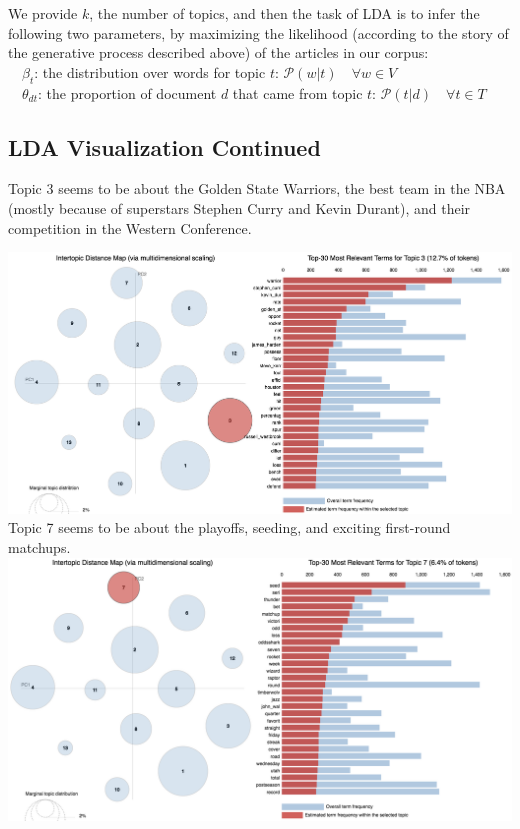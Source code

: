 \documentclass[11pt]{article}
\begin{document}
We provide $k$, the number of topics, and then the task of LDA is to infer the following two parameters, by maximizing the likelihood (according to the story of the generative process described above) of the articles in our corpus: \\
$\text{} \quad \beta_t$: the distribution over words for topic $t$: $\mathcal{P}(w | t) \quad \forall w \in V$ \\
$\text{} \quad \theta_{dt}$: the proportion of document $d$ that came from topic $t$: $\mathcal{P}(t | d) \quad \forall t \in T$ 

\subsection{LDA Visualization Continued}
Topic 3 seems to be about the Golden State Warriors, the best team in the NBA (mostly because of superstars Stephen Curry and Kevin Durant), and their competition in the Western Conference.

\includegraphics[width=470pt]{3.png} \\

Topic 7 seems to be about the playoffs, seeding, and exciting first-round matchups.  \\
\includegraphics[width=470pt]{7.png} \\
\end{document}
